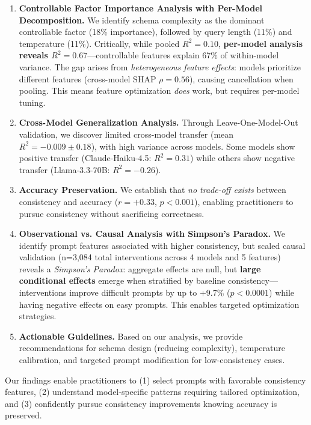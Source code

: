 \documentclass[sigconf,anonymous,review]{acmart}
\begin{document}
\begin{enumerate}
    \item \textbf{Controllable Factor Importance Analysis with Per-Model Decomposition.} We identify schema complexity as the dominant controllable factor (18\% importance), followed by query length (11\%) and temperature (11\%). Critically, while pooled $R^2=0.10$, \textbf{per-model analysis reveals $R^2=0.67$}---controllable features explain 67\% of within-model variance. The gap arises from \textit{heterogeneous feature effects}: models prioritize different features (cross-model SHAP $\rho=0.56$), causing cancellation when pooling. This means feature optimization \textit{does} work, but requires per-model tuning.

    \item \textbf{Cross-Model Generalization Analysis.} Through Leave-One-Model-Out validation, we discover limited cross-model transfer (mean $R^2=-0.009 \pm 0.18$), with high variance across models. Some models show positive transfer (Claude-Haiku-4.5: $R^2=0.31$) while others show negative transfer (Llama-3.3-70B: $R^2=-0.26$).

    \item \textbf{Accuracy Preservation.} We establish that \textit{no trade-off exists} between consistency and accuracy ($r=+0.33$, $p<0.001$), enabling practitioners to pursue consistency without sacrificing correctness.

    \item \textbf{Observational vs. Causal Analysis with Simpson's Paradox.} We identify prompt features associated with higher consistency, but scaled causal validation (n=3,084 total interventions across 4 models and 5 features) reveals a \textit{Simpson's Paradox}: aggregate effects are null, but \textbf{large conditional effects} emerge when stratified by baseline consistency---interventions improve difficult prompts by up to +9.7\% ($p<0.0001$) while having negative effects on easy prompts. This enables targeted optimization strategies.

    \item \textbf{Actionable Guidelines.} Based on our analysis, we provide recommendations for schema design (reducing complexity), temperature calibration, and targeted prompt modification for low-consistency cases.
\end{enumerate}

Our findings enable practitioners to (1) select prompts with favorable consistency features, (2) understand model-specific patterns requiring tailored optimization, and (3) confidently pursue consistency improvements knowing accuracy is preserved.
\end{document}
